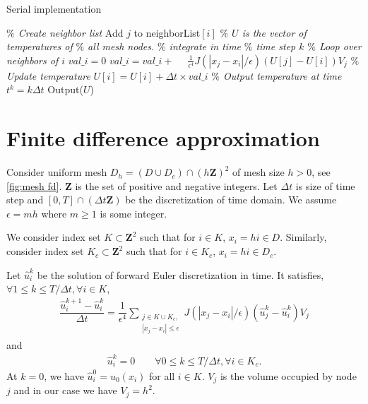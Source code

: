 \documentclass[11pt,twocolumn]{amsart}
\theoremstyle{definition}
\theoremstyle{definition}
\numberwithin{equation}{section}
\numberwithin{equation}{section}
\newcommand{\Z}{\mathbf{Z}}  %
\begin{document}
\begin{algorithm}[ht]
	\caption{Serial implementation}
	\label{alg:serial}
	\begin{algorithmic}[1]
		\STATE \textcolor{mygray}{\it $\%$ Create neighbor list}
				\STATE Add $j$ to neighborList$[i]$
			\ENDIF
		\ENDFOR
		\STATE
		\STATE \textcolor{mygray}{\it $\%$ $U$ is the vector of temperatures of}
		\STATE \textcolor{mygray}{\it $\%$ all mesh nodes.}
		\STATE
		\STATE \textcolor{mygray}{\it $\%$ integrate in time}
			\STATE \textcolor{mygray}{\it $\%$ time step $k$}
				\STATE \textcolor{mygray}{\it $\%$ Loop over neighbors of $i$}
				\STATE $val\_i = 0$
					\STATE $val\_i = val\_i + $					
					\STATE $\quad \frac{1}{\epsilon^4} J(|x_j - x_i|/\epsilon) (U[j] - U[i])V_j$
				\ENDFOR
				\STATE \textcolor{mygray}{\it $\%$ Update temperature}
				\STATE $U[i] = U[i] + \Delta t \times val\_i$
			\ENDFOR	
			\STATE \textcolor{mygray}{\it $\%$ Output temperature at time $t^k = k\Delta t$}
			\STATE Output($U$)
		\ENDFOR
	\end{algorithmic}
\end{algorithm}

\section{Finite difference approximation}
Consider uniform mesh $D_h = (D\cup D_c)\cap (h\Z)^2$ of mesh size $h >0$, see \autoref{fig:mesh fd}. $\Z$ is the set of positive and negative integers. Let $\Delta t$ is size of time step and $[0,T]\cap (\Delta t \Z)$ be the discretization of time domain. We assume $\epsilon = m h$ where $m\geq 1$ is some integer.

We consider index set $K \subset \Z^2$ such that for $i\in K$, $x_i = h i \in D$. Similarly, consider index set $K_c \subset \Z^2$ such that for $i\in K_c$, $x_i = h i \in D_c$.

Let $\hat{u}^k_i$ be the solution of forward Euler discretization in time. It satisfies,$\forall 1\leq k \leq T/\Delta t, \forall i \in K$,
\begin{align}\label{eq:forward fd}
\dfrac{\hat{u}^{k+1}_i - \hat{u}^k_i}{\Delta t} = \dfrac{1}{\epsilon^4} \sum_{\substack{j \in K\cup K_c,\\
|x_j-x_i| \leq \epsilon}} J(|x_j - x_i|/\epsilon) (\hat{u}^k_j - \hat{u}^k_i) V_j
\end{align}
and
\begin{align}
\hat{u}^k_i = 0 \qquad \forall 0\leq k \leq T/\Delta t, \forall i \in K_c.
\end{align}
At $k=0$, we have $\hat{u}^0_i = u_0(x_i)$ for all $i\in K$. $V_j$ is the volume occupied by node $j$ and in our case we have $V_j = h^2$. 
\end{document}
